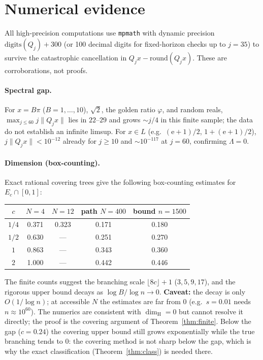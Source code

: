\documentclass[11pt]{article}
\theoremstyle{definition}
\theoremstyle{remark}
\newcommand{\ee}{\mathrm{e}}
\newcommand{\dimH}{\dim_{\mathrm{H}}}
\newcommand{\Lam}{\Lambda}
\begin{document}
\section{Numerical evidence}\label{sec:num}

All high-precision computations use \texttt{mpmath} with dynamic precision
$\mathrm{digits}(Q_j)+300$ (or 100 decimal digits for fixed-horizon checks up
to $j=35$) to survive the catastrophic cancellation in
$Q_jx-\mathrm{round}(Q_jx)$. These are corroborations, not proofs.

\paragraph{Spectral gap.} For $x=B\pi$ ($B=1,\dots,10$), $\sqrt2$, the golden
ratio $\varphi$, and random reals, $\max_{j\le60}j\|Q_jx\|$ lies in $22$--$29$
and grows $\sim j/4$ in this finite sample; the data do not establish an
infinite limsup. For $x\in L$ (e.g.\ $(\ee+1)/2$, $1+(\ee+1)/2$),
$j\|Q_jx\|<10^{-12}$ already for $j\ge10$ and $\sim10^{-117}$ at $j=60$,
confirming $\Lam=0$.

\paragraph{Dimension (box-counting).} Exact rational covering trees give the
following box-counting estimates for $E_c\cap[0,1]$:
\begin{center}
\begin{tabular}{c|cccc}
$c$ & $N=4$ & $N=12$ & path $N=400$ & bound $n=1500$\\\hline
$1/4$ & 0.371 & 0.323 & 0.171 & 0.180\\
$1/2$ & 0.630 & --- & 0.251 & 0.270\\
$1$   & 0.863 & --- & 0.343 & 0.360\\
$2$   & 1.000 & --- & 0.442 & 0.446
\end{tabular}
\end{center}
The finite counts suggest the branching scale $\lfloor8c\rfloor+1$ ($3,5,9,17$), and
the rigorous upper bound decays as $\log B/\log n\to0$. \textbf{Caveat:} the
decay is only $O(1/\log n)$; at accessible $N$ the estimates are far from $0$
(e.g.\ $s=0.01$ needs $n\approx10^{60}$). The numerics are consistent with
$\dimH=0$ but cannot resolve it directly; the proof is the covering argument of
Theorem~\ref{thm:finite}. Below the gap ($c=0.24$) the covering upper bound
still grows exponentially while the true branching tends to $0$: the covering
method is not sharp below the gap, which is why the exact classification
(Theorem~\ref{thm:class}) is needed there.
\end{document}
